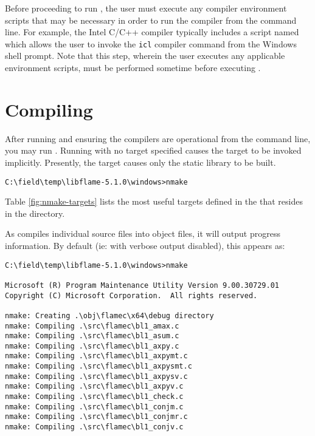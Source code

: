 Before proceeding to run \nmakens, the user must execute any compiler
environment scripts that may be necessary in order to run the compiler from
the command line.
For example, the Intel C/C++ compiler typically includes a script named which
allows the user to invoke the {\tt icl} compiler command from the Windows
shell prompt.
Note that this step, wherein the user executes any applicable environment
scripts, must be performed sometime before executing \nmakens.




\section{Compiling}


After running \configurecmd and ensuring the compilers are operational from
the command line, you may run \nmake.
Running \nmake with no target specified causes the \all target to be
invoked implicitly.
Presently, the \all target causes only the static library to be built.

\begin{Verbatim}[frame=single,framesep=2.5mm,xleftmargin=5mm,fontsize=\footnotesize]
C:\field\temp\libflame-5.1.0\windows>nmake
\end{Verbatim}

\noindent
Table \ref{fig:nmake-targets} lists the most useful \nmake targets defined
in the \makefile that resides in the \windows directory.

As \nmake compiles individual source files into object files, it will output
progress information.
By default (ie: with verbose output disabled), this appears as:

\begin{Verbatim}[frame=single,framesep=2.5mm,xleftmargin=5mm,fontsize=\footnotesize]
C:\field\temp\libflame-5.1.0\windows>nmake

Microsoft (R) Program Maintenance Utility Version 9.00.30729.01
Copyright (C) Microsoft Corporation.  All rights reserved.

nmake: Creating .\obj\flamec\x64\debug directory
nmake: Compiling .\src\flamec\bl1_amax.c
nmake: Compiling .\src\flamec\bl1_asum.c
nmake: Compiling .\src\flamec\bl1_axpy.c
nmake: Compiling .\src\flamec\bl1_axpymt.c
nmake: Compiling .\src\flamec\bl1_axpysmt.c
nmake: Compiling .\src\flamec\bl1_axpysv.c
nmake: Compiling .\src\flamec\bl1_axpyv.c
nmake: Compiling .\src\flamec\bl1_check.c
nmake: Compiling .\src\flamec\bl1_conjm.c
nmake: Compiling .\src\flamec\bl1_conjmr.c
nmake: Compiling .\src\flamec\bl1_conjv.c
\end{Verbatim}

